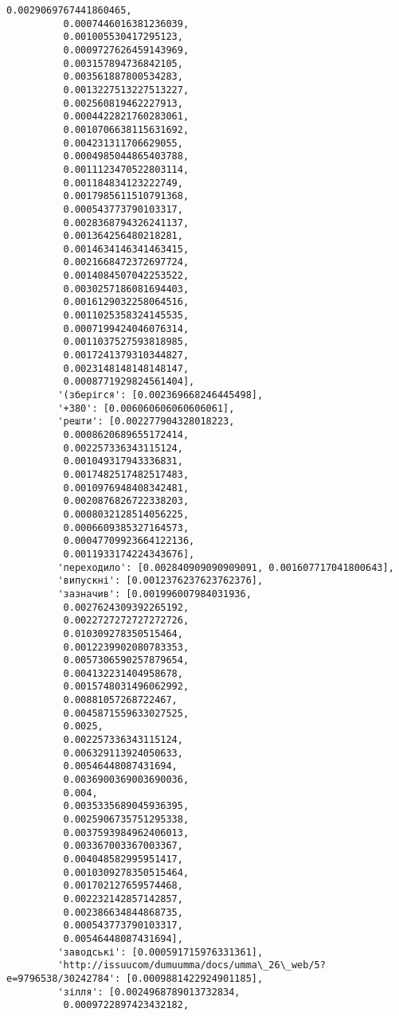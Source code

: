 \documentclass[11pt]{article}
\begin{document}
\begin{Verbatim}[commandchars=\\\{\}]
          0.0029069767441860465,
          0.0007446016381236039,
          0.001005530417295123,
          0.0009727626459143969,
          0.003157894736842105,
          0.003561887800534283,
          0.0013227513227513227,
          0.002560819462227913,
          0.0004422821760283061,
          0.0010706638115631692,
          0.004231311706629055,
          0.0004985044865403788,
          0.0011123470522803114,
          0.001184834123222749,
          0.0017985611510791368,
          0.000543773790103317,
          0.0028368794326241137,
          0.001364256480218281,
          0.0014634146341463415,
          0.0021668472372697724,
          0.0014084507042253522,
          0.0030257186081694403,
          0.0016129032258064516,
          0.0011025358324145535,
          0.0007199424046076314,
          0.0011037527593818985,
          0.0017241379310344827,
          0.0023148148148148147,
          0.0008771929824561404],
         '(зберігся': [0.002369668246445498],
         '+380': [0.006060606060606061],
         'решти': [0.002277904328018223,
          0.0008620689655172414,
          0.002257336343115124,
          0.001049317943336831,
          0.0017482517482517483,
          0.0010976948408342481,
          0.0020876826722338203,
          0.0008032128514056225,
          0.0006609385327164573,
          0.00047709923664122136,
          0.0011933174224343676],
         'переходило': [0.002840909090909091, 0.001607717041800643],
         'випускні': [0.0012376237623762376],
         'зазначив': [0.001996007984031936,
          0.0027624309392265192,
          0.0022727272727272726,
          0.010309278350515464,
          0.0012239902080783353,
          0.0057306590257879654,
          0.004132231404958678,
          0.0015748031496062992,
          0.00881057268722467,
          0.0045871559633027525,
          0.0025,
          0.002257336343115124,
          0.006329113924050633,
          0.00546448087431694,
          0.0036900369003690036,
          0.004,
          0.0035335689045936395,
          0.0025906735751295338,
          0.0037593984962406013,
          0.003367003367003367,
          0.004048582995951417,
          0.0010309278350515464,
          0.001702127659574468,
          0.002232142857142857,
          0.002386634844868735,
          0.000543773790103317,
          0.00546448087431694],
         'заводські': [0.000591715976331361],
         'http://issuucom/dumuumma/docs/umma\_26\_web/5?e=9796538/30242784': [0.0009881422924901185],
         'зілля': [0.0024968789013732834,
          0.0009722897423432182,

\end{Verbatim}
\end{document}
